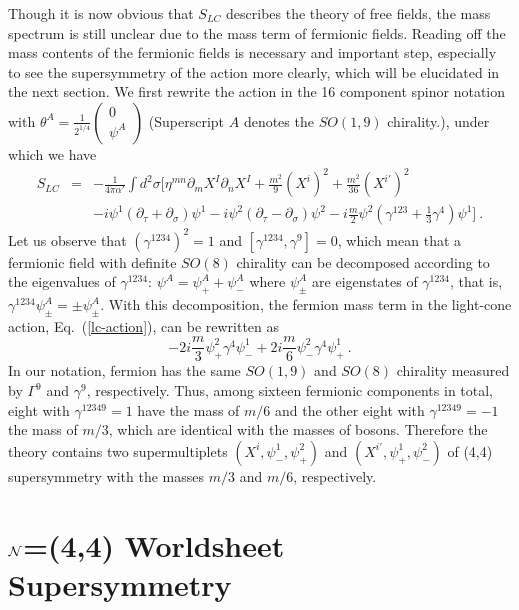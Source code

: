 \documentclass[a4paper,12pt]{article}
\begin{document}
Though it is now obvious that $S_{LC}$ describes the theory of free
fields, the mass spectrum is still unclear due to the mass term of
fermionic fields.  Reading off the mass contents of the fermionic
fields is necessary and important step, especially to see the
supersymmetry of the action more clearly, which will be elucidated in
the next section.  We first rewrite the action in the 16 component
spinor notation with $\theta^A = \frac{1}{2^{1/4}} \left(
\begin{array}{c} 0 \\ \psi^A
\end{array} \right)$ (Superscript $A$ denotes the $SO(1,9)$
chirality.), under which we have
\begin{eqnarray}
S_{LC}
 &=&  - \frac{1}{4 \pi \alpha'} \int  d^2 \sigma
 \Bigg[ \eta^{mn} \partial_m X^I \partial_n X^I 
      + \frac{m^2}{9} (X^i)^2
      + \frac{m^2}{36} (X^{i'})^2
                       \nonumber \\
 & & - i \psi^1 (\partial_\tau + \partial_\sigma ) \psi^1
     - i \psi^2 (\partial_\tau - \partial_\sigma ) \psi^2
     - i \frac{m}{2} \psi^2 \left( \gamma^{123} 
                + \frac{1}{3} \gamma^4 \right) \psi^1
 \Bigg]~.
\label{lc-action}
\end{eqnarray}
Let us observe that $(\gamma^{1234})^2=1$ and $ [ \gamma^{1234},
\gamma^9 ] = 0$, which mean that a fermionic field with definite
$SO(8)$ chirality can be decomposed according to the eigenvalues of
$\gamma^{1234}$: $\psi^A = \psi^A_+ + \psi^A_-$ where $\psi^A_\pm$ are
eigenstates of $\gamma^{1234}$, that is, $\gamma^{1234} \psi^A_\pm =
\pm \psi^A_\pm$.  With this decomposition, the fermion mass term in
the light-cone action, Eq.~(\ref{lc-action}), can be rewritten as
\begin{equation}
-2i \frac{m}{3} \psi^2_+ \gamma^4 \psi^1_-
+2i \frac{m}{6} \psi^2_- \gamma^4 \psi^1_+ ~.
\end{equation}
In our notation, fermion has the same $SO(1,9)$
and $SO(8)$ chirality measured by $\Gamma^9$ and $\gamma^9$,
respectively.  Thus, among sixteen fermionic components in total,
eight with $\gamma^{12349}=1$ have the mass of $m/6$ and the other
eight with $\gamma^{12349}=-1$ the mass of $m/3$, which are identical
with the masses of bosons. Therefore the theory contains two
supermultiplets $(X^i, \psi^1_-, \psi^2_+)$ and $(X^{i'}, \psi^1_+,
\psi^2_-)$ of (4,4) supersymmetry with the masses $m/3$ and $m/6$,
respectively.




\section{${\cal N}$=(4,4) Worldsheet Supersymmetry}
\end{document}
